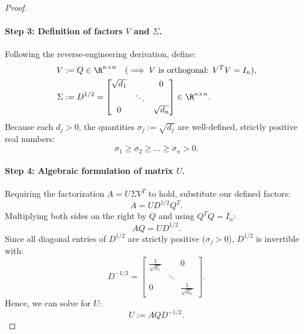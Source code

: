 \begin{proof}
\paragraph{Step 3: Definition of factors $V$ and $\Sigma$.}
Following the reverse-engineering derivation, define:
\begin{align}
    V &:= Q \in \R^{n \times n} \quad (\implies V \text{ is orthogonal: } V^T V = I_n), \\
    \Sigma &:= D^{1/2} = \begin{bmatrix}
        \sqrt{d_1} & & 0 \\
        & \ddots & \\
        0 & & \sqrt{d_n}
    \end{bmatrix} \in \R^{n \times n}.
\end{align}
Because each $d_j > 0$, the quantities $\sigma_j := \sqrt{d_j}$ are well-defined, strictly positive real numbers:
\begin{equation}
    \sigma_1 \ge \sigma_2 \ge \dots \ge \sigma_n > 0.
\end{equation}

\paragraph{Step 4: Algebraic formulation of matrix $U$.}
Requiring the factorization $A = U \Sigma V^T$ to hold, substitute our defined factors:
\begin{equation}
    A = U D^{1/2} Q^T.
\end{equation}
Multiplying both sides on the right by $Q$ and using $Q^T Q = I_n$:
\begin{equation}
    A Q = U D^{1/2}.
\end{equation}
Since all diagonal entries of $D^{1/2}$ are strictly positive ($\sigma_j > 0$), $D^{1/2}$ is invertible with:
\begin{equation}
    D^{-1/2} = \begin{bmatrix}
        \frac{1}{\sqrt{d_1}} & & 0 \\
        & \ddots & \\
        0 & & \frac{1}{\sqrt{d_n}}
    \end{bmatrix}.
\end{equation}
Hence, we can solve for $U$:
\begin{equation}
\label{eq:svd-construct-U-en}
    U := A Q D^{-1/2}.
\end{equation}


\end{proof}

